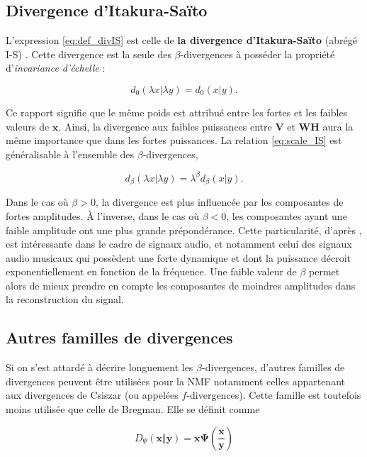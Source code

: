 \subsection{Divergence d'Itakura-Saïto}
L'expression \ref{eq:def_divIS} est celle de \textbf{la divergence d'Itakura-Saïto} (abrégé I-S) \cite{itakura1968analysis, bertin_les_2009}. Cette divergence est la seule des $\beta$-divergences à posséder la propriété d'\textit{invariance d'échelle} :

\begin{equation}\label{eq:scale_IS}
d_{0}(\lambda x \vert \lambda y) = d_{0}(x \vert y).
\end{equation}

Ce rapport signifie que le même poids est attribué entre les fortes et les faibles valeurs de $\mathbf{x}$. Ainsi, la divergence aux faibles puissances entre $\textbf{V}$ et $\textbf{WH}$ aura la même importance que dans les fortes puissances. La relation \ref{eq:scale_IS} est généralisable à l'ensemble des $\beta$-divergences,

\begin{equation}
d_{\beta}(\lambda x \vert \lambda y) = \lambda^{\beta}d_{\beta}(x \vert y).
\end{equation}


Dans le cas où $\beta > 0$, la divergence est plus influencée par les composantes de fortes amplitudes. À l'inverse, dans le cas où $\beta < 0$, les composantes ayant une faible amplitude ont une plus grande prépondérance. Cette particularité, d'après \cite{fevotte_nonnegative_2009}, est intéressante dans le cadre de signaux audio, et notamment celui des signaux audio musicaux qui possèdent une forte dynamique et dont la puissance décroit exponentiellement en fonction de la fréquence. Une faible valeur de $\beta$ permet alors de mieux prendre en compte les composantes de moindres amplitudes dans la reconstruction du signal.

\subsection{Autres familles de divergences}
Si on s'est attardé à décrire longuement les $\beta$-divergences, d'autres familles de divergences peuvent être utilisées pour la NMF notamment celles appartenant aux divergences de Csiszar (ou appelées $f$-divergences). Cette famille est toutefois moins utilisée que celle de Bregman. Elle se définit comme

\begin{equation}
D_{\Psi} (\mathbf{x} \Vert\mathbf{y}) = \mathbf{x} \mathbf{\Psi} \left( \frac{\mathbf{x}}{\mathbf{y}}\right)
\end{equation}


